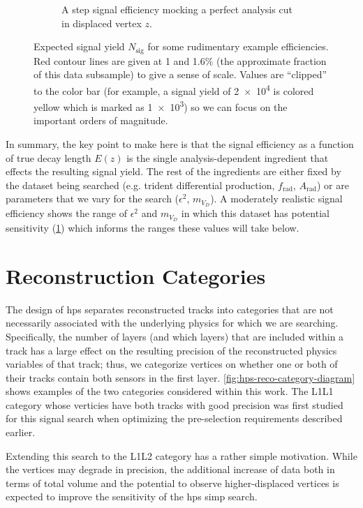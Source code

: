 \begin{figure}
\begin{subfigure}{0.48\textwidth}
    \caption{A step signal efficiency mocking a perfect analysis cut in displaced vertex $z$.}
    \label{fig:n-sig-eg:step}
  \end{subfigure}
  \caption{Expected signal yield $N_\mathrm{sig}$ for some rudimentary example efficiencies.
  Red contour lines are given at 1 and 1.6\% (the approximate fraction of this data subsample)
  to give a sense of scale.
  Values are ``clipped'' to the color bar (for example, a signal yield of \num{2e4} is colored
  yellow which is marked as \num{1e3}) so we can focus on the important orders of magnitude.}
  \label{fig:n-sig-eg}
\end{figure}

In summary, the key point to make here is that the signal efficiency as a function of true
decay length $E(z)$ is the single analysis-dependent ingredient that effects the resulting
signal yield.
The rest of the ingredients are either fixed by the dataset being searched (e.g. trident
differential production, $f_\mathrm{rad}$, $A_\mathrm{rad}$) or are parameters that we
vary for the search ($\epsilon^2$, $m_{V_D}$).
A moderately realistic signal efficiency shows the range of $\epsilon^2$ and $m_{V_D}$
in which this dataset has potential sensitivity (\cref{fig:n-sig-eg:step}) which informs the
ranges these values will take below.


\section{Reconstruction Categories}
\label{sec:hps:recon-cat}
The design of \ac{hps} separates reconstructed tracks into categories that are
not necessarily associated with the underlying physics for which we are searching.
Specifically, the number of layers (and which layers) that are included within a track
has a large effect on the resulting precision of the reconstructed physics variables
of that track; thus, we categorize vertices on whether one or both of their tracks contain
both sensors in the first layer.
\cref{fig:hps-reco-category-diagram} shows examples of the two categories considered
within this work.
The L1L1 category whose verticies have both tracks with good precision was first studied
for this signal search\cite{aspellman-thesis-2024} when optimizing the pre-selection
requirements described earlier.

Extending this search to the L1L2 category has a rather simple motivation.
While the vertices may degrade in precision, the additional increase of data both in terms
of total volume and the potential to observe higher-displaced vertices is expected to improve
the sensitivity of the \ac{hps} \ac{simp} search.

